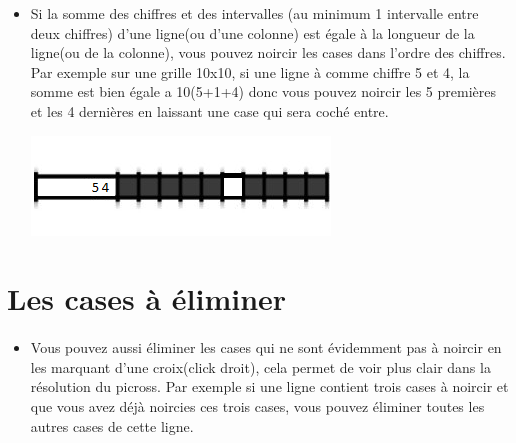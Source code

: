 \begin{itemize}
		\item Si la somme des chiffres et des intervalles (au minimum 1 intervalle entre deux chiffres) d'une ligne(ou d'une colonne) est égale à la longueur de la ligne(ou de la colonne), vous pouvez noircir les cases dans l'ordre des chiffres. Par exemple sur une grille 10x10, si une ligne à comme chiffre 5 et 4, la somme est bien égale a 10(5+1+4) donc vous pouvez noircir les 5 premières et les 4 dernières en laissant une case qui sera coché entre.\\
		
	\begin{center}
		\includegraphics{data/manuels/sommeChiffreInterv.png}
	\end{center}
	
	
	\end{itemize}

\section{Les cases à éliminer}
	\paragraph{}
	\begin{itemize}
		\item Vous pouvez aussi éliminer les cases qui ne sont évidemment pas à noircir en les marquant d'une croix(click droit), cela permet de voir plus clair dans la résolution du picross. Par exemple si une ligne contient trois cases à noircir et que vous avez déjà noircies ces trois cases, vous pouvez éliminer toutes les autres cases de cette ligne.
	\end{itemize}

